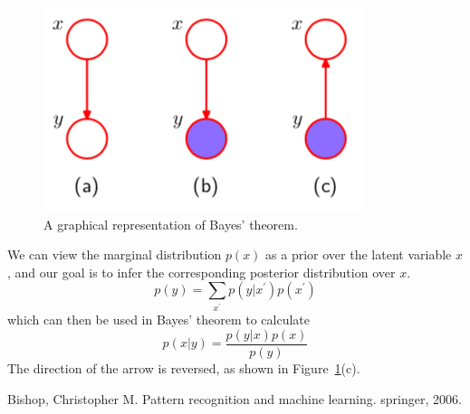 \documentclass[5p,sort&compress]{elsarticle}
\begin{document}
\begin{figure}[ht]
     \centering
     \includegraphics[width =0.9\linewidth]{figure/figure8_37.png}
     \caption{A graphical representation of Bayes' theorem.}
     \label{fig:8_37}
\end{figure}

We can view the marginal distribution $p(x)$ as a prior over the latent variable $x$, and our goal is to infer the corresponding posterior distribution over $x$.
\begin{equation}
p(y)=\sum_{x^{\prime}} p\left(y | x^{\prime}\right) p\left(x^{\prime}\right)
\end{equation}
which can then be used in Bayes' theorem to calculate
\begin{equation}
p(x | y)=\frac{p(y | x) p(x)}{p(y)}
\end{equation}
The direction of the arrow is reversed, as shown in Figure~\ref{fig:8_37}(c).







\begin{thebibliography}{9}

Bishop, Christopher M. Pattern recognition and machine learning. springer, 2006.


\end{thebibliography}
\end{document}

